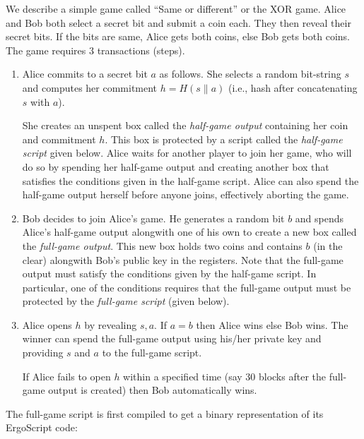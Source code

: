 \documentclass[11pt]{article}
\newcommand{\langname}{ErgoScript\xspace}
\begin{document}
We describe a simple game called ``Same or different'' or the XOR game. Alice and Bob both select a secret bit and submit a coin each. They then reveal their secret bits. If the bits are same, Alice gets both coins, else Bob gets both coins. The game requires 3 transactions (steps). 
\begin{enumerate}
	\item Alice commits to a secret bit $a$ as follows. She selects a random bit-string $s$ and computes her commitment $h = H(s\|a)$ (i.e., hash after concatenating $s$ with $a$).
	
	She creates an unspent box called the {\em half-game output} containing her coin and commitment $h$. This box is protected by a script called the {\em half-game script}  given below. Alice waits for another player to join her game, who will do so by spending her half-game output and creating another box that satisfies the conditions given in the half-game script. Alice can also spend the half-game output herself before anyone joins, effectively aborting the game. 
	

	\item Bob decides to join Alice's game. He generates a random bit $b$ and spends Alice's half-game output alongwith one of his own to create a new box called the {\em full-game output}. This new box  holds two coins and contains $b$ (in the clear) alongwith Bob's public key in the registers. 
	Note that the full-game output must satisfy the conditions given by the half-game script. In particular, one of the conditions requires that the full-game output must be protected by the {\em full-game script} (given below).
	\item Alice opens $h$ by revealing $s, a$. If $a = b$ then Alice wins else Bob wins. The winner can spend the full-game output using his/her private key and providing $s$ and $a$ to the full-game script.

	If Alice fails to open $h$ within a specified time (say 30 blocks after the full-game output is created) then Bob automatically wins. 
\end{enumerate}

The full-game script is first compiled to get a binary representation of its \langname code: 
\end{document}
